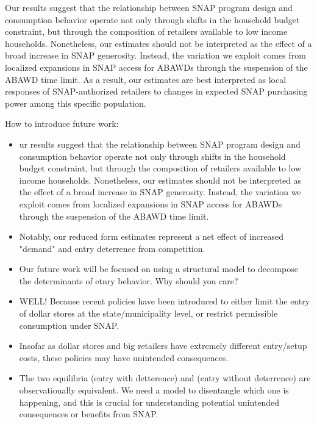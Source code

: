 \documentclass[12pt]{article}
\begin{document}

Our results suggest that the relationship between SNAP program design and consumption behavior operate not only through shifts in the household budget constraint, but through the composition of retailers available to low income households. Nonetheless, our estimates should not be interpreted as the effect of a broad increase in SNAP generosity. Instead, the variation we exploit comes from localized expansions in SNAP access for ABAWDs through the suspension of the ABAWD time limit. As a result, our estimates are best interpreted as local responses of SNAP-authorized retailers to changes in expected SNAP purchasing power among this specific population. 


How to introduce future work:
\begin{itemize}
    \item ur results suggest that the relationship between SNAP program design and consumption behavior operate not only through shifts in the household budget constraint, but through the composition of retailers available to low income households. Nonetheless, our estimates should not be interpreted as the effect of a broad increase in SNAP generosity. Instead, the variation we exploit comes from localized expansions in SNAP access for ABAWDs through the suspension of the ABAWD time limit.
    \item Notably, our reduced form estimates represent a net effect of increased "demand" and entry deterrence from competition.
    \item Our future work will be focused on using a structural model to decompose the determinants of etnry behavior. Why should you care?
    \item WELL! Because recent policies have been introduced to either limit the entry of dollar stores at the state/municipality level, or restrict permissible consumption under SNAP.
    \item Insofar as dollar stores and big retailers have extremely different entry/setup costs, these policies may have unintended consequences.
    \item The two equilibria (entry with detterence) and (entry without deterrence) are observationally equivalent. We need a model to disentangle which one is happening, and this is crucial for understanding potential unintended consequences or benefits from SNAP.
\end{itemize}
\end{document}
